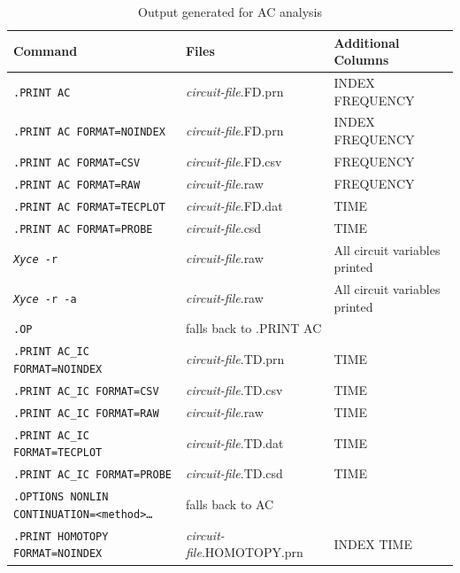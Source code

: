 \begin{table}[htbp]
  \caption{Output generated for AC analysis \label{AC_Output_table}}
  \begin{tabularx}{\linewidth}{|p{2.75in}|Y|Y|}
     \color{white}\textbf{Command} & \color{white}\textbf{Files} & \color{white}\textbf{Additional Columns} \\ \hline
\texttt{.PRINT AC} & \emph{circuit-file}.FD.prn & INDEX FREQUENCY \\ \hline
\texttt{.PRINT AC FORMAT=NOINDEX} & \emph{circuit-file}.FD.prn & INDEX FREQUENCY \\ \hline
\texttt{.PRINT AC FORMAT=CSV} & \emph{circuit-file}.FD.csv & FREQUENCY \\ \hline
\texttt{.PRINT AC FORMAT=RAW} & \emph{circuit-file}.raw & FREQUENCY \\ \hline
\texttt{.PRINT AC FORMAT=TECPLOT} & \emph{circuit-file}.FD.dat & TIME \\ \hline
\texttt{.PRINT AC FORMAT=PROBE} & \emph{circuit-file}.csd & TIME \\ \hline

\texttt{\emph{Xyce} -r} & \emph{circuit-file}.raw & All circuit variables printed \\ \hline
\texttt{\emph{Xyce} -r -a} & \emph{circuit-file}.raw & All circuit variables printed \\ \hline

\texttt{.OP}  & falls back to .PRINT AC \\ \hline
\texttt{.PRINT AC\_IC FORMAT=NOINDEX} & \emph{circuit-file}.TD.prn & TIME \\ \hline
\texttt{.PRINT AC\_IC FORMAT=CSV} & \emph{circuit-file}.TD.csv & TIME \\ \hline
\texttt{.PRINT AC\_IC FORMAT=RAW} & \emph{circuit-file}.raw & TIME \\ \hline
\texttt{.PRINT AC\_IC FORMAT=TECPLOT} & \emph{circuit-file}.TD.dat & TIME \\ \hline
\texttt{.PRINT AC\_IC FORMAT=PROBE} & \emph{circuit-file}.TD.csd & TIME \\ \hline

\texttt{.OPTIONS NONLIN CONTINUATION=<method>\ldots} & falls back to AC \\ \hline
\texttt{.PRINT HOMOTOPY FORMAT=NOINDEX} & \emph{circuit-file}.HOMOTOPY.prn & INDEX TIME \\ \hline

  \end{tabularx}
\end{table}


